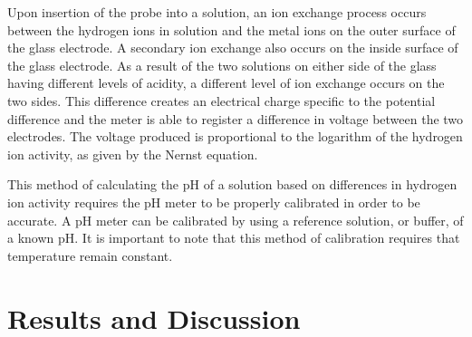 \documentclass{article}
\begin{document}
Upon insertion of the probe into a solution, an ion exchange process occurs
between the hydrogen ions in solution and the metal ions on the outer surface of
the glass electrode. A secondary ion exchange also occurs on the inside surface
of the glass electrode.  As a result of the two solutions on either side of the
glass having different levels of acidity, a different level of ion exchange
occurs on the two sides.  This difference creates an electrical charge specific
to the potential difference and the meter is able to register a difference in
voltage between the two electrodes. The voltage produced is proportional to the
logarithm of the hydrogen ion activity, as given by the Nernst equation.
\cite{electrode}

This method of calculating the pH of a solution based on differences in hydrogen
ion activity requires the pH meter to be properly calibrated in order to be
accurate. A pH meter can be calibrated by using a reference solution, or buffer,
of a known pH. It is important to note that this method of calibration requires
that temperature remain constant. 

\newpage


\section {Results and Discussion}
\end{document}
